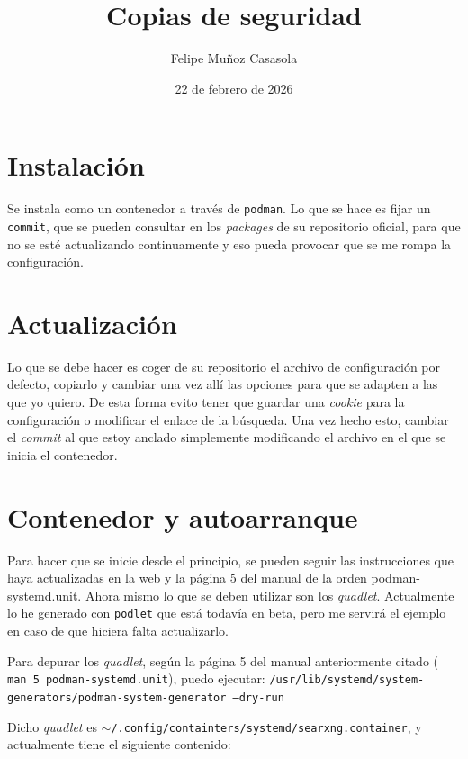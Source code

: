 \documentclass{article}
\title{Copias de seguridad}
\author{Felipe Muñoz Casasola}
\date{22 de febrero de 2026}
\begin{document}
    \maketitle
    \clearpage

    \section{Instalación}
    Se instala como un contenedor a través de \texttt{podman}. Lo que se
    hace es fijar un \texttt{commit}, que se pueden consultar en los
    \textit{packages} de su repositorio oficial, para que no se esté
    actualizando continuamente y eso pueda provocar que se me rompa la
    configuración.

    \section{Actualización}
    Lo que se debe hacer es coger de su repositorio el archivo de configuración
    por defecto, copiarlo y cambiar una vez allí las opciones para que se
    adapten a las que yo quiero. De esta forma evito tener que guardar una
    \textit{cookie} para la configuración o modificar el enlace de la
    búsqueda. Una vez hecho esto, cambiar el \textit{commit} al que estoy
    anclado simplemente modificando el archivo en el que se inicia
    el contenedor.

    \section{Contenedor y autoarranque}
    Para hacer que se inicie desde el principio, se pueden seguir las instrucciones que haya actualizadas
    en la web y la página 5 del manual de la orden podman-systemd.unit. Ahora mismo lo que se deben
    utilizar son los \textit{quadlet}. Actualmente lo he generado con \texttt{podlet} que está todavía en beta, pero me
    servirá el ejemplo en caso de que hiciera falta actualizarlo.

    Para depurar los \textit{quadlet}, según la página 5 del manual anteriormente citado (
    \texttt{man 5 podman-systemd.unit}), puedo ejecutar: \texttt{/usr/lib/systemd/system-generators/podman-system-generator --dry-run}
    
    Dicho \textit{quadlet} es \texttt{$\sim$/.config/containters/systemd/searxng.container},
    y actualmente tiene el siguiente contenido:

    \inputminted[breaklines, breakanywhere, breaksymbolleft="", breaksymbolright="", breakanywheresymbolpre="", breakanywheresymbolpost=""]
    {systemd}{inc/searxng.container}
\end{document}
